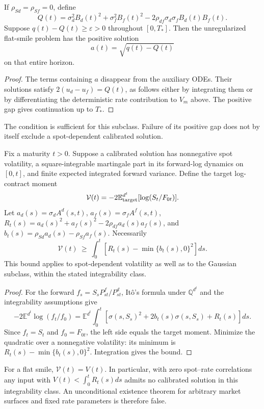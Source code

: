 \begin{cor}
If $\rho_{Sd}=\rho_{Sf}=0$, define
\[
Q(t)=\sigma_d^2 B_d(t)^2+\sigma_f^2 B_f(t)^2
       -2\rho_{df}\sigma_d\sigma_f B_d(t)B_f(t).
\]
Suppose $q(t)-Q(t)\geq\varepsilon>0$ throughout $[0,T_*]$.
Then the unregularized flat-smile problem has the positive solution
\[
a(t)=\sqrt{q(t)-Q(t)}
\]
on that entire horizon.
\end{cor}
\begin{proof}
The terms containing $a$ disappear from the auxiliary ODEs. Their solutions
satisfy $2(u_d-u_f)=Q(t)$, as follows either by integrating them or by
differentiating the deterministic rate contribution to $V_m$ above.
The positive gap gives continuation up to $T_*$.
\end{proof}
The condition is sufficient for this subclass. Failure of its positive gap
does not by itself exclude a spot-dependent calibrated solution.

\begin{prop}\label{prop: logbound}
Fix a maturity $t>0$. Suppose a calibrated solution has nonnegative spot
volatility, a square-integrable martingale part in its forward-log dynamics
on $[0,t]$, and finite
expected integrated forward variance. Define the target log-contract moment
\[
\mathcal V(t)=-2\mathbb E^{d^t}_{\rm target}
                 [\log(S_t/F_{0t})].
\]
Let $a_d(s)=\sigma_d A^d(s,t)$, $a_f(s)=\sigma_f A^f(s,t)$,
$R_t(s)=a_d(s)^2+a_f(s)^2-2\rho_{df}a_d(s)a_f(s)$, and
$b_t(s)=\rho_{Sd}a_d(s)-\rho_{Sf}a_f(s)$. Necessarily
\[
\mathcal V(t)\ \geq\ \int_0^t
\left[R_t(s)-\min\{b_t(s),0\}^2\right]ds.
\]
This bound applies to spot-dependent volatility as well as to the Gaussian
subclass, within the stated integrability class.
\end{prop}
\begin{proof}
For the forward $f_s=S_sP^f_{st}/P^d_{st}$, It\^o's formula under
$\mathbb Q^{d^t}$ and the integrability assumptions give
\[
-2\mathbb E^{d^t}\log(f_t/f_0)
=\mathbb E^{d^t}\int_0^t
   [\sigma(s,S_s)^2+2b_t(s)\sigma(s,S_s)+R_t(s)]ds.
\]
Since $f_t=S_t$ and $f_0=F_{0t}$, the left side equals the target moment.
Minimize the quadratic over a nonnegative volatility: its minimum is
$R_t(s)-\min\{b_t(s),0\}^2$. Integration gives the bound.
\end{proof}
For a flat smile, $\mathcal V(t)=V(t)$. In particular, with zero spot--rate
correlations any input with $V(t)<\int_0^tR_t(s)ds$ admits no calibrated
solution in this integrability class. An unconditional existence theorem for
arbitrary market surfaces and fixed rate parameters is therefore false.

